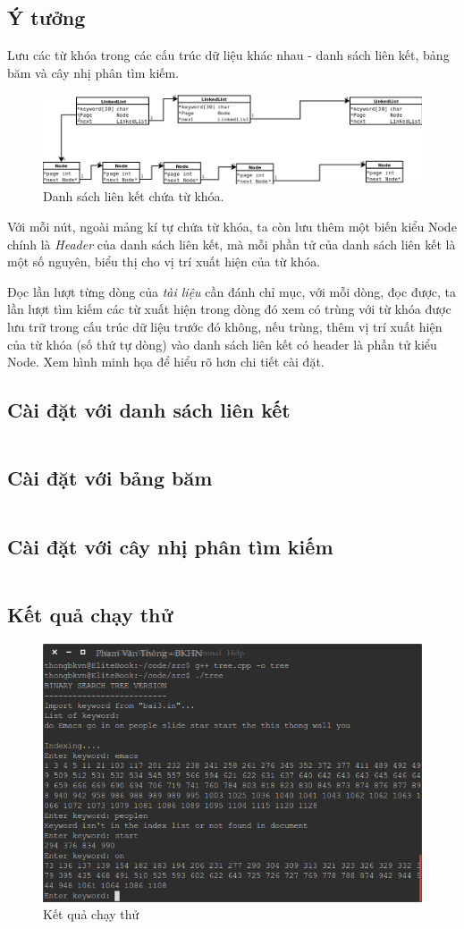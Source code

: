 \documentclass[8pt, a4paper]{article}
\newcommand{\mnt}[1]{\inputminted[frame=single, linenos=true, tabsize=4]{c++}{#1}}
\begin{document}
\subsection{Ý tưởng}
Lưu các từ khóa trong các cấu trúc dữ liệu khác nhau - danh sách liên kết, bảng băm và cây nhị phân tìm kiếm.
\begin{figure}[htp]
\centering
\includegraphics[scale=0.40]{img/Diagram1.png}
\caption{Danh sách liên kết chứa từ khóa.}
\label{}
\end{figure}
Với mỗi nút, ngoài mảng kí tự chứa từ khóa, ta còn lưu thêm một biến kiểu Node chính là \emph{Header} của danh sách liên kết, mà mỗi phần tử của danh sách liên kết là một số nguyên, biểu thị cho vị trí xuất hiện của từ khóa.

Đọc lần lượt từng dòng của \emph{tài liệu} cần đánh chỉ mục, với mỗi dòng, đọc được, ta lần lượt tìm kiếm các từ xuất hiện trong dòng đó xem có trùng với từ khóa được lưu trữ trong cấu trúc dữ liệu trước đó không, nếu trùng, thêm vị trí xuất hiện của từ khóa (số thứ tự dòng) vào danh sách liên kết có header là phần tử kiểu Node. Xem hình minh họa để hiểu rõ hơn chi tiết cài đặt.



\subsection{Cài đặt với danh sách liên kết}
\mnt{src/linkedlist.cpp}
\newpage
\subsection{Cài đặt với bảng băm}
\mnt{src/hashtable.cpp}
\newpage
\subsection{Cài đặt với cây nhị phân tìm kiếm}
\mnt{src/tree.cpp}
\subsection{Kết quả chạy thử}
\begin{figure}[htp]
\centering
\includegraphics[scale=0.5]{img/kqbai3.png}
\caption{Kết quả chạy thử}
\label{}
\end{figure}
\end{document}
